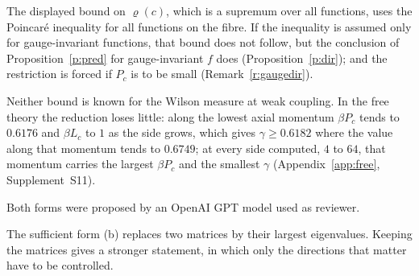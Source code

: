 \begin{remark}
\begin{enumerate}
The displayed bound on
$\varrho(c)$, which is a supremum over all functions, uses the Poincar\'e inequality for all functions on the
fibre. If the inequality is assumed only for gauge-invariant functions, that bound does not follow, but the
conclusion of Proposition~\ref{p:pred} for gauge-invariant $f$ does (Proposition~\ref{p:dir}); and the
restriction is forced if $P_c$ is to be small (Remark~\ref{r:gaugedir}).

Neither bound is known for the Wilson measure at weak coupling. In the free theory the reduction loses little: along the lowest axial momentum
$\beta P_c$ tends to $0.6176$ and $\beta L_c$ to $1$ as the side grows, which gives $\gamma\ge0.6182$ where the
value along that momentum tends to $0.6749$; at every side computed, $4$ to $64$, that momentum carries the
largest $\beta P_c$ and the smallest $\gamma$ (Appendix~\ref{app:free}, Supplement~S11).
\end{enumerate}
Both forms were proposed by an OpenAI GPT model used as reviewer.
\end{remark}

The sufficient form (b) replaces two matrices by their largest eigenvalues. Keeping the matrices gives a
stronger statement, in which only the directions that matter have to be controlled.

